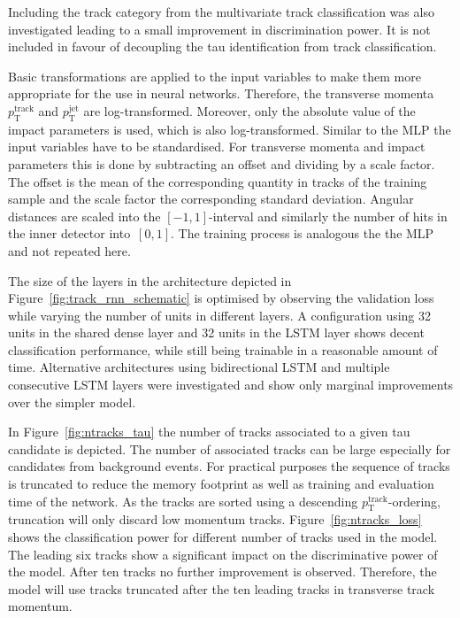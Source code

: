 Including the track category from the multivariate track classification was also
investigated leading to a small improvement in discrimination power. It is not
included in favour of decoupling the tau identification from track
classification.

Basic transformations are applied to the input variables to make them more
appropriate for the use in neural networks. Therefore, the transverse
momenta~$p_\text{T}^\text{track}$ and $p_\text{T}^\text{jet}$ are
log-transformed. Moreover, only the absolute value of the impact parameters is
used, which is also log-transformed. Similar to the MLP the input variables have
to be standardised. For transverse momenta and impact parameters this is done by
subtracting an offset and dividing by a scale factor. The offset is the mean of
the corresponding quantity in tracks of the training sample and the scale factor
the corresponding standard deviation. Angular distances are scaled into the
$[-1, 1]$-interval and similarly the number of hits in the inner detector
into~$[0, 1]$. The training process is analogous the the MLP and not repeated
here.

The size of the layers in the architecture depicted in
Figure~\ref{fig:track_rnn_schematic} is optimised by observing the validation
loss while varying the number of units in different layers. A configuration
using 32 units in the shared dense layer and 32 units in the LSTM layer shows
decent classification performance, while still being trainable in a reasonable
amount of time. Alternative architectures using bidirectional LSTM and multiple
consecutive LSTM layers were investigated and show only marginal improvements
over the simpler model.

In Figure~\ref{fig:ntracks_tau} the number of tracks associated to a given tau
candidate is depicted. The number of associated tracks can be large especially
for candidates from background events. For practical purposes the sequence of
tracks is truncated to reduce the memory footprint as well as training and
evaluation time of the network. As the tracks are sorted using a descending
$p_\text{T}^\text{track}$-ordering, truncation will only discard low momentum
tracks. Figure~\ref{fig:ntracks_loss} shows the classification power for
different number of tracks used in the model. The leading six tracks show a
significant impact on the discriminative power of the model. After ten tracks no
further improvement is observed. Therefore, the model will use tracks truncated
after the ten leading tracks in transverse track momentum.

